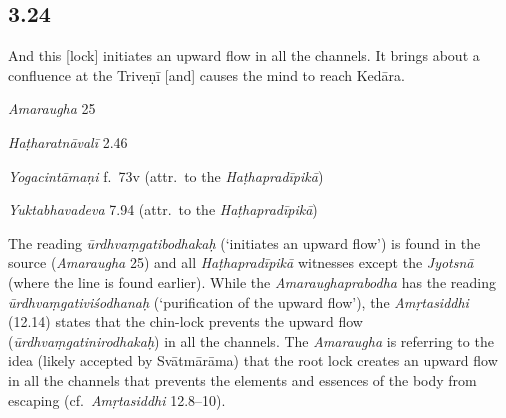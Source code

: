 \begin{ekdosis}
\subsection*{3.24}
\begin{translation}[hp03_024]
And this [lock] initiates an upward flow in all the channels. It brings about a confluence at the Triveṇī [and] causes the mind to reach Kedāra.
\end{translation}

\begin{sources}[hp03_024]
\emph{Amaraugha} 25
\begin{versinnote}
\end{versinnote}
\end{sources}

\begin{testimonia}[hp03_024]
\emph{Haṭharatnāvalī} 2.46
\begin{versinnote}
\end{versinnote}

\emph{Yogacintāmaṇi} f.~73v (attr.~to the \emph{Haṭhapradīpikā})
\begin{versinnote}
\end{versinnote}

\emph{Yuktabhavadeva} 7.94 (attr.~to the \emph{Haṭhapradīpikā})
\begin{versinnote}
\end{versinnote}
\end{testimonia}

\begin{philcomm}[hp03_024]
The reading \emph{ūrdhvaṃgatibodhakaḥ} (`initiates an upward flow') is found in the source (\emph{Amaraugha} 25) and all \emph{Haṭhapradīpikā} witnesses except the \emph{Jyotsnā} (where the line is found earlier). While the \emph{Amaraughaprabodha} has the reading \emph{ūrdhvaṃgativiśodhanaḥ} (`purification of the upward flow'), the \emph{Amṛtasiddhi} (12.14) states that the chin-lock prevents the upward flow (\emph{ūrdhvaṃgatinirodhakaḥ}) in all the channels. The \textit{Amaraugha} is referring to the idea (likely accepted by Svātmārāma) that the root lock creates an upward flow in all the channels that prevents the elements and essences of the body from escaping (cf.~\emph{Amṛtasiddhi} 12.8–10).


\end{philcomm}
\end{ekdosis}
